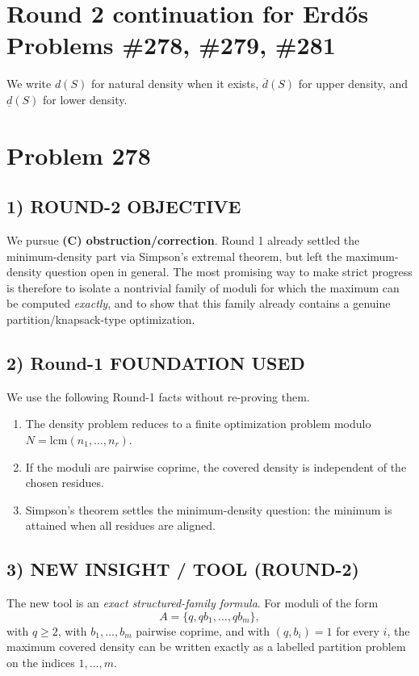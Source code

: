 
\section*{Round 2 continuation for Erd\H{o}s Problems \#278, \#279, \#281}

We write $d(S)$ for natural density when it exists, $\overline d(S)$ for upper density, and $\underline d(S)$ for lower density.

\section*{Problem 278}

\subsection*{1) ROUND-2 OBJECTIVE}

We pursue \textbf{(C) obstruction/correction}. Round 1 already settled the minimum-density part via Simpson's extremal theorem, but left the maximum-density question open in general. The most promising way to make strict progress is therefore to isolate a nontrivial family of moduli for which the maximum can be computed \emph{exactly}, and to show that this family already contains a genuine partition/knapsack-type optimization.

\subsection*{2) Round-1 FOUNDATION USED}

We use the following Round-1 facts without re-proving them.

\begin{enumerate}
\item The density problem reduces to a finite optimization problem modulo $N=\mathrm{lcm}(n_1,\dots,n_r)$.
\item If the moduli are pairwise coprime, the covered density is independent of the chosen residues.
\item Simpson's theorem settles the minimum-density question: the minimum is attained when all residues are aligned.
\end{enumerate}

\subsection*{3) NEW INSIGHT / TOOL (ROUND-2)}

The new tool is an \emph{exact structured-family formula}. For moduli of the form
\[
A=\{q,qb_1,\dots,qb_m\},
\]
with $q\ge 2$, with $b_1,\dots,b_m$ pairwise coprime, and with $(q,b_i)=1$ for every $i$, the maximum covered density can be written exactly as a labelled partition problem on the indices $1,\dots,m$.

